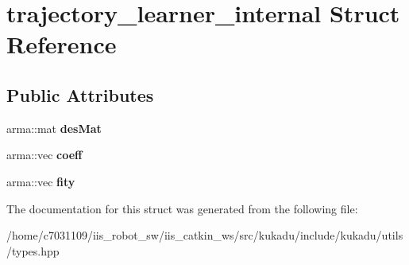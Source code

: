 \hypertarget{structtrajectory__learner__internal}{\section{trajectory\-\_\-learner\-\_\-internal Struct Reference}
\label{structtrajectory__learner__internal}
}
\subsection*{Public Attributes}
\begin{DoxyCompactItemize}
\item 
\hypertarget{structtrajectory__learner__internal_acfb301377b9742e3683d20b485668018}{arma\-::mat {\bfseries des\-Mat}}\label{structtrajectory__learner__internal_acfb301377b9742e3683d20b485668018}

\item 
\hypertarget{structtrajectory__learner__internal_acaadde0fada7f99179f74597342c1490}{arma\-::vec {\bfseries coeff}}\label{structtrajectory__learner__internal_acaadde0fada7f99179f74597342c1490}

\item 
\hypertarget{structtrajectory__learner__internal_a05839c6bdb48c5f3cce87225f79197c9}{arma\-::vec {\bfseries fity}}\label{structtrajectory__learner__internal_a05839c6bdb48c5f3cce87225f79197c9}

\end{DoxyCompactItemize}


The documentation for this struct was generated from the following file\-:\begin{DoxyCompactItemize}
\item 
/home/c7031109/iis\-\_\-robot\-\_\-sw/iis\-\_\-catkin\-\_\-ws/src/kukadu/include/kukadu/utils/types.\-hpp\end{DoxyCompactItemize}
